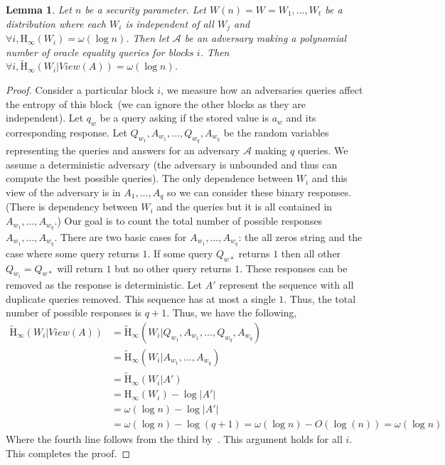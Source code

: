 \documentclass[11pt]{article}
\newcommand{\consref}[1]{\mbox{Construction~\ref{#1}}}
\newcommand{\Hoo}{\mathrm{H}_\infty}
\newcommand{\Hav}{\tilde{\mathrm{H}}_\infty}
\newtheorem{lemma}[theorem]{Lemma}
\begin{document}
\begin{lemma}
Let $n$ be a security parameter.  Let $W(n) = W = W_1,..., W_t$ be a distribution where each $W_i$ is independent of all $W_j$ and $\forall i, \Hoo(W_i) = \omega(\log n)$.  Then let $\mathcal{A}$ be an adversary making a polynomial number of oracle equality queries for blocks $i$.  %
Then $\forall i, \Hav(W_i | View(A))  = \omega(\log n)$.
\end{lemma}
\begin{proof}
Consider a particular block $i$, we measure how an adversaries queries affect the entropy of this block~(we can ignore the other blocks as they are independent).  
Let $q_w$ be a query asking if the stored value is $a_w$ and its corresponding response.  
Let $Q_{w_1},A_{w_1},..., Q_{w_q}, A_{w_q}$ be the random variables representing the queries and answers for an  adversary $\mathcal{A}$ making $q$ queries.  We assume a deterministic adversary (the adversary is unbounded and thus can compute the best possible queries).  The only dependence between $W_i$ and this view of the adversary is in $A_1,..., A_q$ so we can consider these binary responses.  (There is dependency between $W_i$ and the queries but it is all contained in $A_{w_1},..., A_{w_q}$.)  Our goal is to count the total number of possible responses $A_{w_1},..., A_{w_q}$.  There are two basic cases for $A_{w_1},..., A_{w_q}$: the all zeros string and the case where some query returns $1$.  If some query $Q_{w*}$ returns $1$ then all other $Q_{w_i} = Q_{w*}$ will return $1$ but no other query returns $1$.  These responses can be removed as the response is deterministic.  Let $A'$ represent the sequence with all duplicate queries removed.  This sequence has at most a single $1$.  Thus, the total number of possible responses is $q+1$.  Thus, we have the following,
\begin{align*}
\Hav(W_i | View(A)) &= \Hav(W_i| Q_{w_1}, A_{w_1},..., Q_{w_q}, A_{w_q})\\
&=\Hav(W_i | A_{w_1},..., A_{w_q})\\
&=\Hav(W_i |A') \\
&=\Hoo(W_i) - \log |A'|\\
&= \omega(\log n) - \log |A'|\\
&= \omega(\log n) - \log (q+1) = \omega(\log n) - O(\log(n)) = \omega(\log n)
\end{align*}
Where the fourth line follows from the third by~\cite[Lemma 2.2]{DBLP:journals/siamcomp/DodisORS08}.
This argument holds for all $i$.  This completes the proof.

\end{proof}
\end{document}
